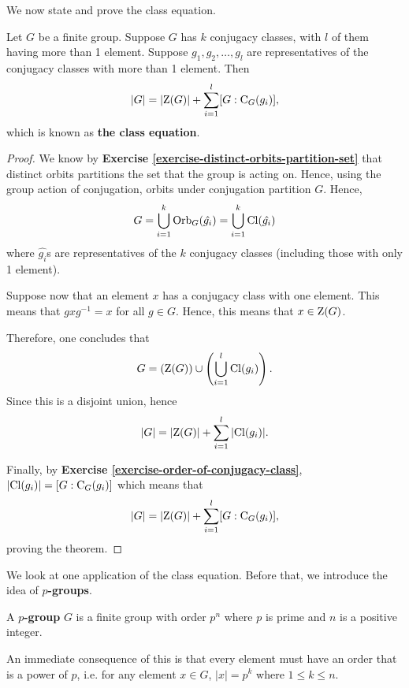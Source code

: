 We now state and prove the class equation.
\begin{theorem}\label{thrm-class-equation}
    Let $G$ be a finite group. Suppose $G$ has $k$ conjugacy classes, with $l$ of them having more than 1 element. Suppose $g_1, g_2, \dots, g_l$ are representatives of the conjugacy classes with more than 1 element. Then
    \[
        |G| = |\mathrm{Z}(G)| + \sum_{i=1}^l [G : \mathrm{C}_{G}(g_i)],
    \]
    which is known as \textbf{the class equation}.
\end{theorem}

\begin{proof}
    We know by \textbf{Exercise \ref{exercise-distinct-orbits-partition-set}} that distinct orbits partitions the set that the group is acting on. Hence, using the group action of conjugation, orbits under conjugation partition $G$. Hence,
    \[
        G = \bigcup_{i=1}^k \mathrm{Orb}_{G}(\hat{g_i}) = \bigcup_{i=1}^k \mathrm{Cl}(\hat{g_i})
    \]
    where $\hat{g_i}$s are representatives of the $k$ conjugacy classes (including those with only 1 element).

    Suppose now that an element $x$ has a conjugacy class with one element. This means that $gxg^{-1} = x$ for all $g \in G$. Hence, this means that $x \in \mathrm{Z}(G)$.

    Therefore, one concludes that
    \[
        G = \left(\mathrm{Z}(G)\right) \cup \left(\bigcup_{i=1}^l \mathrm{Cl}(g_i)\right).
    \]
    Since this is a disjoint union, hence
    \[
        |G| = |\mathrm{Z}(G)| + \sum_{i=1}^l |\mathrm{Cl}(g_i)|.
    \]

    Finally, by \textbf{Exercise \ref{exercise-order-of-conjugacy-class}}, $|\mathrm{Cl}(g_i)| = [G : \mathrm{C}_{G}(g_i)]$ which means that
    \[
        |G| = |\mathrm{Z}(G)| + \sum_{i=1}^l [G:\mathrm{C}_{G}(g_i)],
    \]
    proving the theorem.
\end{proof}

We look at one application of the class equation. Before that, we introduce the idea of \textbf{$p$-groups}.
\begin{definition}
    A \textbf{$p$-group} $G$ is a finite group with order $p^n$ where $p$ is prime and $n$ is a positive integer.
\end{definition}
An immediate consequence of this is that every element must have an order that is a power of $p$, i.e. for any element $x \in G$, $|x| = p^k$ where $1 \leq k \leq n$.

